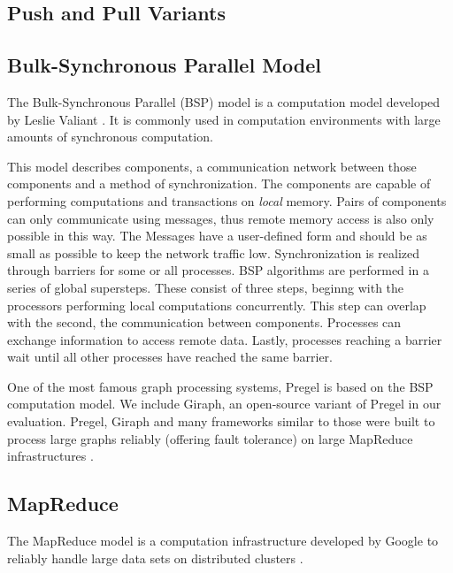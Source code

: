 \subsection{Push and Pull Variants}

\subsection{Bulk-Synchronous Parallel Model}
\label{sec:bsp}
The Bulk-Synchronous Parallel (BSP) model is a computation model developed by Leslie Valiant \cite{bsp}. It is commonly used in computation environments with large amounts of synchronous computation.

This model describes components, a communication network between those components and a method of synchronization.
The components are capable of performing computations and transactions on \emph{local} memory. Pairs of components can only communicate using messages, thus remote memory access is also only possible in this way.
The Messages have a user-defined form and should be as small as possible to keep the network traffic low. 
Synchronization is realized through barriers for some or all processes.
BSP algorithms are performed in a series of global supersteps. These consist of three steps, beginng with the processors performing local computations concurrently.
This step can overlap with the second, the communication between components. Processes can exchange information to access remote data.
Lastly, processes reaching a barrier wait until all other processes have reached the same barrier.

One of the most famous graph processing systems, Pregel \cite{pregel} is based on the BSP computation model. We include Giraph, an open-source variant of Pregel in our evaluation.
Pregel, Giraph and many frameworks similar to those were built to process large graphs reliably (offering fault tolerance) on large MapReduce infrastructures \cite{Giraph,graphx,powergraph}.

\subsection{MapReduce}
The MapReduce model is a computation infrastructure developed by Google to reliably handle large data sets on distributed clusters \cite{mapreduce}.

